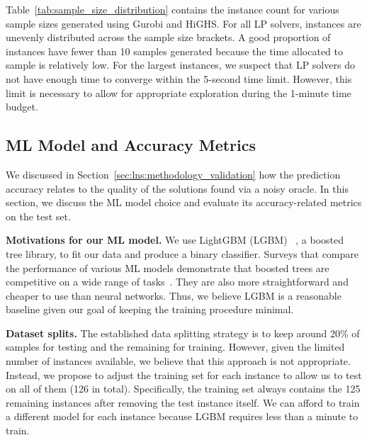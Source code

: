 \documentclass[3p, authoryear, times]{elsarticle}
\begin{document}
Table~\ref{tab:sample_size_distribution} contains the instance count for various sample sizes generated using Gurobi and HiGHS. For all LP solvers, instances are unevenly distributed across the sample size brackets. A good proportion of instances have fewer than 10 samples generated because the time allocated to sample is relatively low. For the largest instances, we suspect that LP solvers do not have enough time to converge within the 5-second time limit. However, this limit is necessary to allow for appropriate exploration during the 1-minute time budget. 

\subsection{ML Model and Accuracy Metrics} \label{sec:lns:accuracy_metrics}
We discussed in Section~\ref{sec:lns:methodology_validation} how the prediction accuracy relates to the quality of the solutions found via a noisy oracle. In this section, we discuss the ML model choice and evaluate its accuracy-related metrics on the test set. 

\textbf{Motivations for our ML model.} We use LightGBM (LGBM) ~\citep{ke_lightgbm_2017}, a boosted tree library, to fit our data and produce a binary classifier. Surveys that compare the performance of various ML models demonstrate that boosted trees are competitive on a wide range of tasks~\citep{caruana_empirical_2006, borisov_deep_2022_2}. They are also more straightforward and cheaper to use than neural networks. Thus, we believe LGBM is a reasonable baseline given our goal of keeping the training procedure minimal. %

\textbf{Dataset splits.}  The established data splitting strategy is to keep around 20\% of samples for testing and the remaining for training. However, given the limited number of instances available, we believe that this approach is not appropriate. Instead, we propose to adjust the training set for each instance to allow us to test on all of them (126 in total). Specifically, the training set always contains the 125 remaining instances after removing the test instance itself. We can afford to train a different model for each instance because LGBM requires less than a minute to train. 
\end{document}
